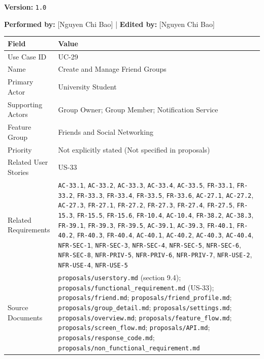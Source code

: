 \documentclass[12pt]{article}
\renewcommand{\baselinestretch}{1.5}
\begin{document}
\textbf{Version:} \texttt{1.0}
\par\medskip

\textbf{Performed by:} [Nguyen Chi Bao] | \textbf{Edited by:} [Nguyen Chi Bao]
\par\medskip

\begingroup
\small
\renewcommand{\baselinestretch}{1.0}\selectfont
\renewcommand{\arraystretch}{1.15}
\setlength{\tabcolsep}{6pt}
\begin{longtable}{|>{\raggedright\arraybackslash}p{}|>{\raggedright\arraybackslash}p{}|}
\hline
\textbf{Field} & \textbf{Value} \\ \hline
\endhead
Use Case ID & UC-29 \\ \hline
Name & Create and Manage Friend Groups \\ \hline
Primary Actor & University Student \\ \hline
Supporting Actors & Group Owner; Group Member; Notification Service \\ \hline
Feature Group & Friends and Social Networking \\ \hline
Priority & Not explicitly stated (Not specified in proposals) \\ \hline
Related User Stories & US-33 \\ \hline
Related Requirements & \texttt{AC-33.1}, \texttt{AC-33.2}, \texttt{AC-33.3}, \texttt{AC-33.4}, \texttt{AC-33.5}, \texttt{FR-33.1}, \texttt{FR-33.2}, \texttt{FR-33.3}, \texttt{FR-33.4}, \texttt{FR-33.5}, \texttt{FR-33.6}, \texttt{AC-27.1}, \texttt{AC-27.2}, \texttt{AC-27.3}, \texttt{FR-27.1}, \texttt{FR-27.2}, \texttt{FR-27.3}, \texttt{FR-27.4}, \texttt{FR-27.5}, \texttt{FR-15.3}, \texttt{FR-15.5}, \texttt{FR-15.6}, \texttt{FR-10.4}, \texttt{AC-10.4}, \texttt{FR-38.2}, \texttt{AC-38.3}, \texttt{FR-39.1}, \texttt{FR-39.3}, \texttt{FR-39.5}, \texttt{AC-39.1}, \texttt{AC-39.3}, \texttt{FR-40.1}, \texttt{FR-40.2}, \texttt{FR-40.3}, \texttt{FR-40.4}, \texttt{AC-40.1}, \texttt{AC-40.2}, \texttt{AC-40.3}, \texttt{AC-40.4}, \texttt{NFR-SEC-1}, \texttt{NFR-SEC-3}, \texttt{NFR-SEC-4}, \texttt{NFR-SEC-5}, \texttt{NFR-SEC-6}, \texttt{NFR-SEC-8}, \texttt{NFR-PRIV-5}, \texttt{NFR-PRIV-6}, \texttt{NFR-PRIV-7}, \texttt{NFR-USE-2}, \texttt{NFR-USE-4}, \texttt{NFR-USE-5} \\ \hline
Source Documents & \texttt{proposals/userstory.md} (section 9.4); \texttt{proposals/functional\_requirement.md} (US-33); \texttt{proposals/friend.md}; \texttt{proposals/friend\_profile.md}; \texttt{proposals/group\_detail.md}; \texttt{proposals/settings.md}; \texttt{proposals/overview.md}; \texttt{proposals/feature\_flow.md}; \texttt{proposals/screen\_flow.md}; \texttt{proposals/API.md}; \texttt{proposals/response\_code.md}; \texttt{proposals/non\_functional\_requirement.md} \\ \hline
\end{longtable}
\endgroup
\par\medskip
\end{document}
